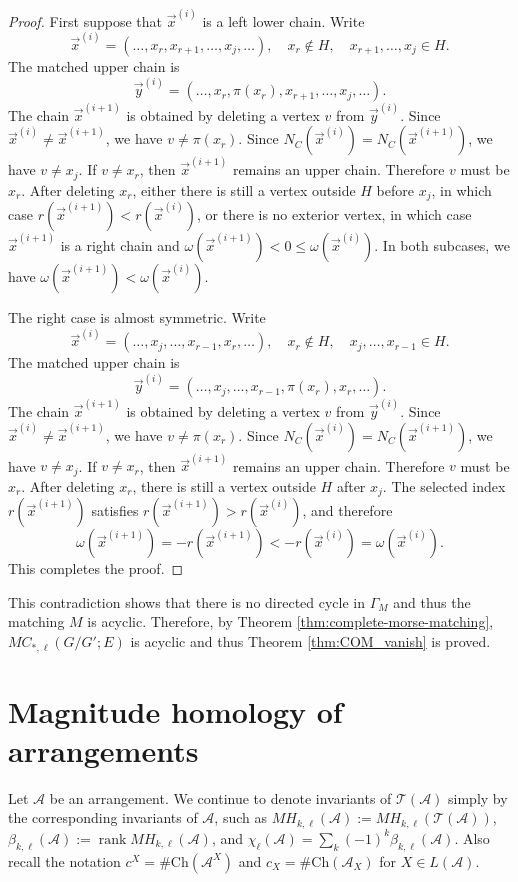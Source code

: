 \documentclass{amsart}
\numberwithin{equation}{section}
\theoremstyle{plain}
\theoremstyle{remark}
\theoremstyle{definition}
\numberwithin{equation}{section}
\newcommand{\A}{\mathcal{A}}
\newcommand{\T}{\mathcal{T}}
\newcommand{\Ch}{\mathrm{Ch}}
\DeclareMathOperator{\rank}{rank}
\begin{document}
\begin{proof}
First suppose that $\vec{x}^{(i)}$ is a left lower chain.
Write
\[
  \vec{x}^{(i)}=(\dots,x_r,x_{r+1},\dots,x_j,\dots),
  \quad x_r\notin H,\quad x_{r+1},\ldots,x_j\in H.
\]
The matched upper chain is
\[
  \vec{y}^{(i)}=(\dots,x_r,\pi(x_r),x_{r+1},\dots,x_j,\dots).
\]
The chain $\vec{x}^{(i+1)}$ is obtained by deleting a vertex $v$ from $\vec{y}^{(i)}$.
Since $\vec{x}^{(i)}\neq\vec{x}^{(i+1)}$, we have $v\neq \pi(x_r)$.
Since $N_C(\vec{x}^{(i)})=N_C(\vec{x}^{(i+1)})$, we have $v\neq x_j$.
If $v\neq x_r$, then $\vec{x}^{(i+1)}$ remains an upper chain.
Therefore $v$ must be $x_r$.
After deleting $x_r$, either there is still a vertex outside $H$ before $x_j$, in which case $r(\vec{x}^{(i+1)})<r(\vec{x}^{(i)})$, or there is no exterior vertex, in which case $\vec{x}^{(i+1)}$ is a right chain and $\omega(\vec{x}^{(i+1)})<0\leq \omega(\vec{x}^{(i)})$.  In both subcases, we have $\omega(\vec{x}^{(i+1)})<\omega(\vec{x}^{(i)}).$

The right case is almost symmetric.
Write
\[
  \vec{x}^{(i)}=(\dots,x_j,\dots,x_{r-1},x_r,\dots),
  \quad x_r\notin H,\quad x_j,\dots,x_{r-1}\in H.
\]
The matched upper chain is
\[
  \vec{y}^{(i)}=(\dots,x_j,\dots,x_{r-1},\pi(x_r),x_r,\dots).
\]
The chain $\vec{x}^{(i+1)}$ is obtained by deleting a vertex $v$ from $\vec{y}^{(i)}$.
Since $\vec{x}^{(i)}\neq\vec{x}^{(i+1)}$, we have $v\neq \pi(x_r)$.
Since $N_C(\vec{x}^{(i)})=N_C(\vec{x}^{(i+1)})$, we have $v\neq x_j$.
If $v\neq x_r$, then $\vec{x}^{(i+1)}$ remains an upper chain.
Therefore $v$ must be $x_r$.
After deleting $x_r$, there is still a vertex outside $H$ after $x_j$.
The selected index $r(\vec{x}^{(i+1)})$ satisfies $r(\vec{x}^{(i+1)})>r(\vec{x}^{(i)})$, and therefore
\[
  \omega(\vec{x}^{(i+1)})=-r(\vec{x}^{(i+1)})<-r(\vec{x}^{(i)})=\omega(\vec{x}^{(i)}).
\]
This completes the proof.
\end{proof}

This contradiction shows that there is no directed cycle in $\Gamma_M$ and thus the matching $M$ is acyclic.
Therefore, by Theorem \ref{thm:complete-morse-matching}, $MC_{*,\ell}(G/G';E)$ is acyclic and thus Theorem \ref{thm:COM_vanish} is proved.




\section{Magnitude homology of arrangements}

Let $\A$ be an arrangement.
We continue to denote invariants of $\T(\A)$ simply by the corresponding invariants of $\A$, such as $MH_{k,\ell}(\A):=MH_{k,\ell}(\T(\A))$, $\beta_{k,\ell}(\A):=\rank MH_{k,\ell}(\A)$, and $\chi_{\ell}(\A)=\sum_k(-1)^k\beta_{k,\ell}(\A)$. Also recall the notation $c^X=\#\Ch(\A^X)$ and $c_X=\#\Ch(\A_X)$ for $X\in L(\A)$.
\end{document}
